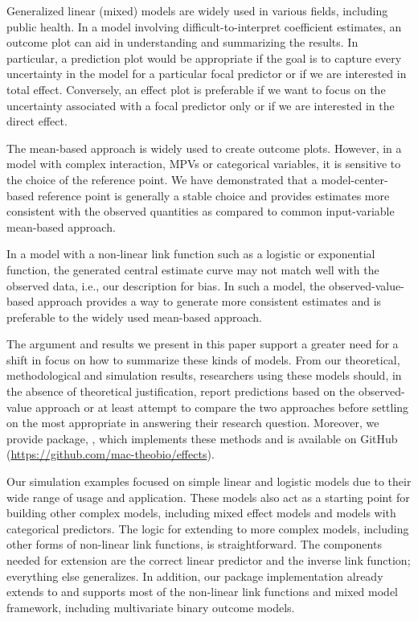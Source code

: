 Generalized linear (mixed) models are widely used in various fields, including public health. In a model involving difficult-to-interpret coefficient estimates, an outcome plot can aid in understanding and summarizing the results. In particular, a prediction plot would be appropriate if the goal is to capture every uncertainty in the model for a particular focal predictor or if we are interested in total effect. Conversely, an effect plot is preferable if we want to focus on the uncertainty associated with a focal predictor only or if we are interested in the direct effect.

The mean-based approach is widely used to create outcome plots. However, in a model with complex interaction, MPVs or categorical variables, it is sensitive to the choice of the reference point. We have demonstrated that a model-center-based reference point is generally a stable choice and provides estimates more consistent with the observed quantities as compared to common input-variable mean-based approach.

In a model with a non-linear link function such as a logistic or exponential function, the generated central estimate curve may not match well with the observed data, i.e., our description for bias. In such a model, the observed-value-based approach provides a way to generate more consistent estimates and is preferable to the widely used mean-based approach.

The argument and results we present in this paper support a greater need for a shift in focus on how to summarize these kinds of models. From our theoretical, methodological and simulation results, researchers using these models should, in the absence of theoretical justification, report predictions based on the observed-value approach or at least attempt to compare the two approaches before settling on the most appropriate in answering their research question. Moreover, we provide  package, , which implements these methods and is available on GitHub (\href{https://github.com/mac-theobio/effects}{https://github.com/mac-theobio/effects}).

Our simulation examples focused on simple linear and logistic models due to their wide range of usage and application. These models also act as a starting point for building other complex models, including mixed effect models and models with categorical predictors. The logic for extending to more complex models, including other forms of non-linear link functions, is straightforward. The components needed for extension are the correct linear predictor and the inverse link function; everything else generalizes. In addition, our  package implementation already extends to and supports most of the non-linear link functions and mixed model framework, including multivariate binary outcome models.

